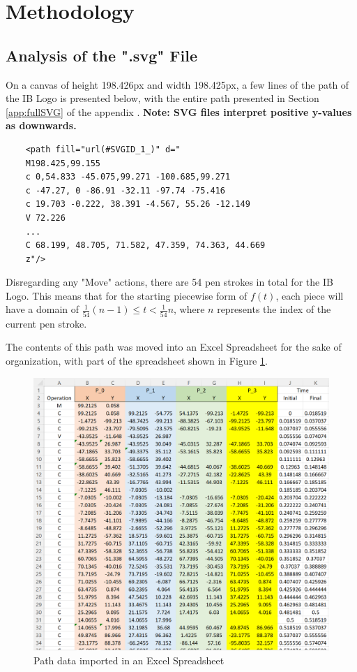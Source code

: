 \documentclass[letterpaper, 12pt]{article}
\begin{document}
\section{Methodology}

\subsection{Analysis of the ".svg" File} \label{svgAnalysis}

On a canvas of height 198.426px and width 198.425px,
a few lines of the path of the IB Logo is presented below,
with the entire path presented in Section \ref*{app:fullSVG}
of the appendix
\cite{internationalbaccalaureateorganisationInternationalBaccalaureateLogo2013}. \textbf{Note: SVG files interpret positive y-values as downwards.}

\begin{verbatim}
    <path fill="url(#SVGID_1_)" d="
    M198.425,99.155
    c 0,54.833 -45.075,99.271 -100.685,99.271
    c -47.27, 0 -86.91 -32.11 -97.74 -75.416
    c 19.703 -0.222, 38.391 -4.567, 55.26 -12.149
    V 72.226
    ...
    C 68.199, 48.705, 71.582, 47.359, 74.363, 44.669
    z"/>
\end{verbatim}

Disregarding any "Move" actions, there are 54 pen strokes
in total for the IB Logo. This means that for the starting piecewise
form of \(f(t)\), each piece will have a domain of \(\frac{1}{54}(n-1) \le t < \frac{1}{54}n\),
where \(n\) represents the index of the current pen stroke.

The contents of this path was moved into an Excel Spreadsheet for
the sake of organization, with part of the spreadsheet shown
in Figure \ref*{fig:svgxlsx}.

\begin{figure}[H]
    \centering
    \includegraphics[width=\textwidth]{svgxlsx.png}
    \caption{Path data imported in an Excel Spreadsheet}
    \label{fig:svgxlsx}
\end{figure}
\end{document}
